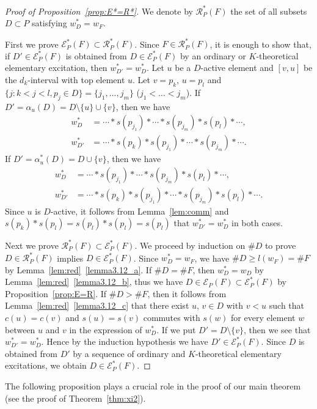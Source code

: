 \documentclass[ALCO,ThmDefs,Unicode,epreuves]{cedram}
\newcommand\EE{\mathcal{E}}
\newcommand\RR{\mathcal{R}}
\begin{document}
\begin{proof}[Proof of Proposition~\ref{prop:E*=R*}]
We denote by $\RR^*_P(F)$ the set of all subsets $D \subset P$ satisfying $w^*_D = w_F$.

First we prove $\EE^*_P(F) \subset \RR^*_P(F)$.
Since $F \in \RR^*_P(F)$, it is enough to show that, 
if $D' \in \EE^*_P(F)$ is obtained from $D \in \EE^*_P(F)$ by an ordinary or $K$-theoretical elementary excitation, 
then $w^*_{D'} = w^*_D$.
Let $u$ be a $D$-active element and $[v,u]$ be the $d_k$-interval with top element $u$.
Let $v = p_k$, $u = p_l$ and $\{ j : k < j < l, p_j \in D \} = \{ j_1, \dots, j_m \}$ ($j_1 < \dots < j_m$).
If $D' = \alpha_u(D) = D \setminus \{ u \} \cup \{ v \}$, then we have
\begin{align*}
w^*_D &= \cdots * s(p_{j_1}) * \cdots * s(p_{j_m}) * s(p_l) * \cdots,
\\
w^*_{D'} &= \cdots * s(p_k) * s(p_{j_1}) * \cdots * s(p_{j_m}) * \cdots.
\end{align*}
If $D' = \alpha^*_u(D) = D \cup \{ v \}$, then we have
\begin{align*}
w^*_D &= \cdots * s(p_{j_1}) * \cdots * s(p_{j_m}) * s(p_l) * \cdots,
\\
w^*_{D'} &= \cdots * s(p_k) * s(p_{j_1}) * \cdots * s(p_{j_m}) * s(p_l) * \cdots.
\end{align*}
Since $u$ is $D$-active, it follows from Lemma~\ref{lem:comm} and $s(p_k)*s(p_l) = s(p_l)*s(p_l) = s(p_l)$ 
that $w^*_{D'} = w^*_D$ in both cases.

Next we prove $\RR^*_P(F) \subset \EE^*_P(F)$.
We proceed by induction on $\# D$ to prove $D \in \RR^*_P(F)$ implies $D \in \EE^*_P(F)$.
Since $w^*_D = w_F$, we have $\# D \ge l(w_F) = \# F$ by Lemma~\ref{lem:red}~\ref{lemma3.12_a}.
If $\# D = \# F$, then $w^*_D = w_D$ by Lemma~\ref{lem:red}~\ref{lemma3.12_b}, 
thus we have $D \in \EE_P(F) \subset \EE^*_P(F)$ by Proposition~\ref{prop:E=R}.
If $\# D > \# F$, then it follows from Lemma~\ref{lem:red}~\ref{lemma3.12_c} that 
there exist $u$, $v \in D$ with $v < u$ such that $c(u) = c(v)$ and 
$s(u) = s(v)$ commutes with $s(w)$ for
every element $w$ between $u$ and $v$ in the expression of $w^*_D$.
If we put $D' = D \setminus \{ v \}$, then we see that $w^*_{D'} = w^*_D$.
Hence by the induction hypothesis we have $D' \in \EE^*_P(F)$.
Since $D$ is obtained from $D'$ by a sequence of ordinary and $K$-theoretical elementary excitations, 
we obtain $D \in \EE^*_P(F)$.
\end{proof}

The following proposition plays a crucial role in the proof of our main theorem 
(see the proof of Theorem~\ref{thm:xi2}).
\end{document}
